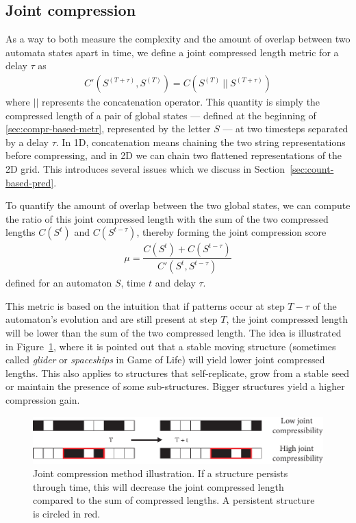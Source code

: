 \subsection{Joint compression}\label{sec:joint-compression}

As a way to both measure the complexity and the amount of overlap between two
automata states apart in time, we define a joint compressed length metric for a
delay $\tau$ as
\begin{align}
  \textstyle C'\left(S^{(T + \tau)}, S^{(T)}\right) =
  C\left(S^{(T)}\ ||\ S^{(T + \tau)}\right)
\end{align}
where $||$ represents the concatenation operator. This quantity is simply the
compressed length of a pair of global states --- defined at the beginning of
\ref{sec:compr-based-metr}, represented by the letter $S$ --- at two timesteps
separated by a delay $\tau$. In 1D, concatenation means chaining the two string
representations before compressing, and in 2D we can chain two flattened
representations of the 2D grid. This introduces several issues which we discuss
in Section~\ref{sec:count-based-pred}.

To quantify the amount of overlap between the two global states, we can compute
the ratio of this joint compressed length with the sum of the two compressed
lengths $C(S^t)$ and $C(S^{t-\tau})$, thereby forming the joint compression
score
\begin{align}
  \textstyle \mu = \dfrac{C\left( S^t \right) +
  C\left( S^{t - \tau} \right)}{C'\left( S^t, S^{t - \tau} \right)}
\end{align}
defined for an automaton $S$, time $t$ and delay $\tau$.

This metric is based on the intuition that if patterns occur at step $T - \tau$
of the automaton's evolution and are still present at step $T$, the joint
compressed length will be lower than the sum of the two compressed length. The
idea is illustrated in Figure~\ref{fig:joint_schema}, where it is pointed out
that a stable moving structure (sometimes called \emph{glider} or
\emph{spaceships} in Game of Life) will yield lower joint compressed lengths.
This also applies to structures that self-replicate, grow from a stable seed or
maintain the presence of some sub-structures. Bigger structures yield a higher
compression gain.

\begin{figure}[htbp]
  \centering
  \includegraphics[width=.8\linewidth]{figures/joint_comp_1d}
  \caption{Joint compression method illustration. If a structure persists
    through time, this will decrease the joint compressed length compared to the
    sum of compressed lengths. A persistent structure is circled in red.}
  \label{fig:joint_schema}
\end{figure}


